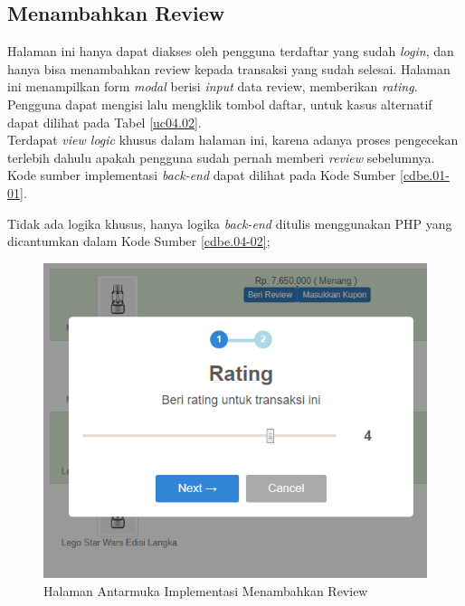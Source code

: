 \subsection{Menambahkan Review}
    Halaman ini hanya dapat diakses oleh pengguna terdaftar yang sudah \textit{login}, dan hanya bisa menambahkan review kepada transaksi yang sudah selesai. Halaman ini menampilkan form \textit{modal} berisi \textit{input} data review, memberikan \textit{rating}. Pengguna dapat mengisi lalu mengklik tombol daftar, untuk kasus alternatif dapat dilihat pada Tabel \ref{uc04.02}.\\
	\indent Terdapat \textit{view logic} khusus dalam halaman ini, karena adanya proses pengecekan terlebih dahulu apakah pengguna sudah pernah memberi \textit{review} sebelumnya. Kode sumber implementasi \textit{back-end} dapat dilihat pada Kode Sumber \ref{cdbe.01-01}.

	\indent Tidak ada logika khusus, hanya logika \textit{back-end} ditulis menggunakan PHP yang dicantumkan dalam Kode Sumber \ref{cdbe.04-02};

\begin{figure}[H]
\centering
\includegraphics[width=\textwidth]{images/bab4/ui/04-02a.png}
\caption{Halaman Antarmuka Implementasi Menambahkan Review}
\label{ui.04-02a}
\end{figure}


